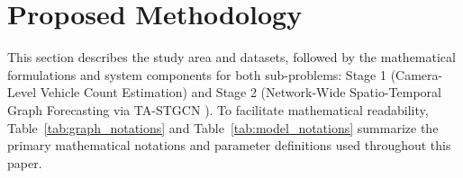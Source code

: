 \documentclass[journal,twocolumn]{IEEEtran}
\begin{document}
\section{Proposed Methodology}
\label{sec:methods}

This section describes the study area and datasets, followed by the mathematical formulations and system components for both sub-problems: Stage 1 (Camera-Level Vehicle Count Estimation) and Stage 2 (Network-Wide Spatio-Temporal Graph Forecasting via TA-STGCN \cite{stgcn, attention}). To facilitate mathematical readability, Table~\ref{tab:graph_notations} and Table~\ref{tab:model_notations} summarize the primary mathematical notations and parameter definitions used throughout this paper.
\end{document}
